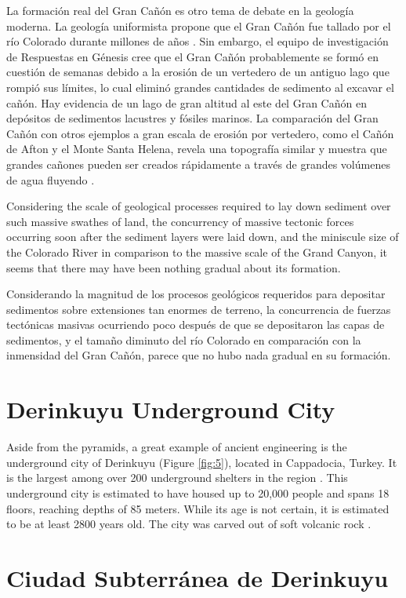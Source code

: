 \documentclass[10pt,twocolumn,letterpaper]{article}
\begin{document}
La formación real del Gran Cañón es otro tema de debate en la geología moderna. La geología uniformista propone que el Gran Cañón fue tallado por el río Colorado durante millones de años \cite{47}. Sin embargo, el equipo de investigación de Respuestas en Génesis cree que el Gran Cañón probablemente se formó en cuestión de semanas debido a la erosión de un vertedero de un antiguo lago que rompió sus límites, lo cual eliminó grandes cantidades de sedimento al excavar el cañón. Hay evidencia de un lago de gran altitud al este del Gran Cañón en depósitos de sedimentos lacustres y fósiles marinos. La comparación del Gran Cañón con otros ejemplos a gran escala de erosión por vertedero, como el Cañón de Afton y el Monte Santa Helena, revela una topografía similar y muestra que grandes cañones pueden ser creados rápidamente a través de grandes volúmenes de agua fluyendo \cite{48}.

Considering the scale of geological processes required to lay down sediment over such massive swathes of land, the concurrency of massive tectonic forces occurring soon after the sediment layers were laid down, and the miniscule size of the Colorado River in comparison to the massive scale of the Grand Canyon, it seems that there may have been nothing gradual about its formation.

Considerando la magnitud de los procesos geológicos requeridos para depositar sedimentos sobre extensiones tan enormes de terreno, la concurrencia de fuerzas tectónicas masivas ocurriendo poco después de que se depositaron las capas de sedimentos, y el tamaño diminuto del río Colorado en comparación con la inmensidad del Gran Cañón, parece que no hubo nada gradual en su formación.

\section{Derinkuyu Underground City}

Aside from the pyramids, a great example of ancient engineering is the underground city of Derinkuyu (Figure \ref{fig:5}), located in Cappadocia, Turkey. It is the largest among over 200 underground shelters in the region \cite{54}. This underground city is estimated to have housed up to 20,000 people and spans 18 floors, reaching depths of 85 meters. While its age is not certain, it is estimated to be at least 2800 years old. The city was carved out of soft volcanic rock \cite{52, 53}.

\section{Ciudad Subterránea de Derinkuyu}
\end{document}
